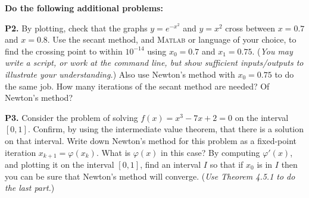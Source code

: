 \documentclass[12pt]{amsart}
\newcommand{\Matlab}{\textsc{Matlab}\xspace}
\begin{document}
\bigskip\bigskip
\noindent \textbf{Do the following additional problems:}

\bigskip
\noindent \textbf{P2.}  By plotting, check that the graphs $y=e^{-x^2}$ and $y=x^2$ cross between $x=0.7$ and $x=0.8$.  Use the secant method, and \Matlab or language of your choice, to find the crossing point to within $10^{-14}$ using $x_0=0.7$ and $x_1=0.75$.  (\emph{You may write a script, or work at the command line, but show sufficient inputs/outputs to illustrate your understanding.})  Also use Newton's method with $x_0=0.75$ to do the same job.  How many iterations of the secant method are needed?  Of Newton's method?

\bigskip
\noindent \textbf{P3.}  Consider the problem of solving $f(x)=x^3-7x+2=0$ on the interval $[0,1]$.  Confirm, by using the intermediate value theorem, that there is a solution on that interval.  Write down Newton's method for this problem as a fixed-point iteration $x_{k+1} = \varphi(x_k)$.  What is $\varphi(x)$ in this case?  By computing $\varphi'(x)$, and plotting it on the interval $[0,1]$, find an interval $I$ so that if $x_0$ is in $I$ then you can be sure that Newton's method will converge.  (\emph{Use Theorem 4.5.1 to do the last part.})
\end{document}
